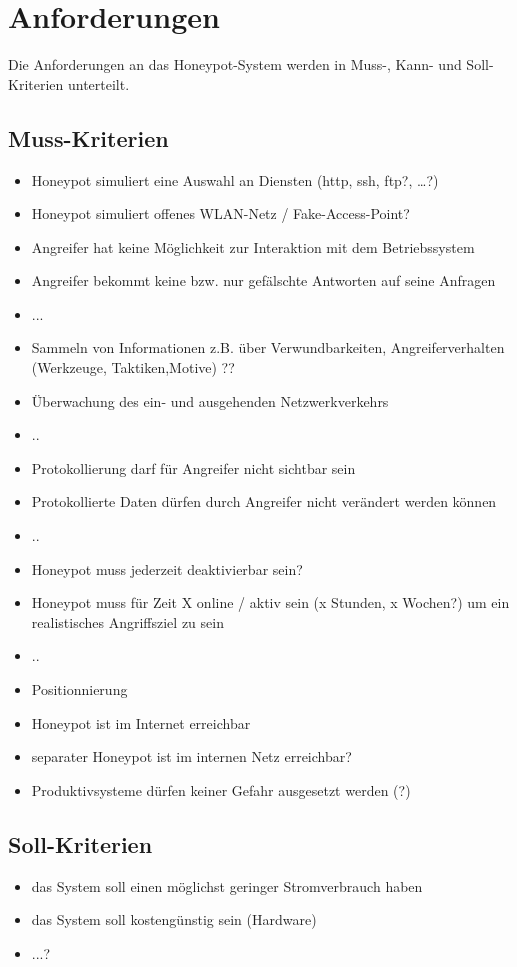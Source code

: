 \chapter{Anforderungen}
\label{sec:Anforderungen}

Die Anforderungen an das Honeypot-System werden in Muss-, Kann- und Soll-Kriterien unterteilt.


\section{Muss-Kriterien}
\label{subsec:Muss-Kriterien}
\begin{itemize}
\item Honeypot simuliert eine Auswahl an Diensten (http, ssh, ftp?, …?)
\item Honeypot simuliert offenes WLAN-Netz / Fake-Access-Point?
\item Angreifer hat keine Möglichkeit zur Interaktion mit dem Betriebssystem
\item Angreifer bekommt keine bzw. nur gefälschte Antworten auf seine Anfragen
\item ...
\item Sammeln von Informationen z.B. über Verwundbarkeiten, Angreiferverhalten (Werkzeuge, Taktiken,Motive)  ??
\item Überwachung des ein- und ausgehenden Netzwerkverkehrs
\item ..
\item Protokollierung darf für Angreifer nicht sichtbar sein
\item Protokollierte Daten dürfen durch Angreifer nicht verändert werden können
\item ..
\item Honeypot muss jederzeit deaktivierbar sein?
\item Honeypot muss für Zeit X online / aktiv sein (x Stunden, x Wochen?) um ein realistisches Angriffsziel zu sein
\item ..
\item Positionnierung
\item Honeypot ist im Internet erreichbar
\item separater Honeypot ist im internen Netz erreichbar?
\item Produktivsysteme dürfen keiner Gefahr ausgesetzt werden (?)
\end{itemize}



\section{Soll-Kriterien}
\label{subsec:Soll-Kriterien}
\begin{itemize}
\item das System soll einen möglichst geringer Stromverbrauch haben
\item das System soll kostengünstig sein (Hardware)
\item ...?
\end{itemize}


